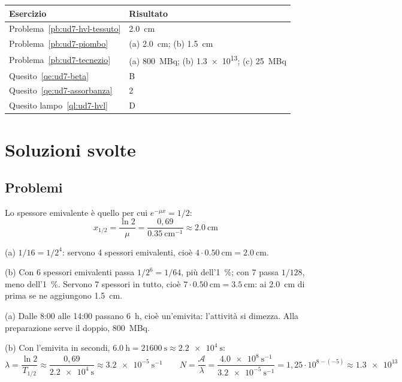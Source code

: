 \begin{center}
\begin{tabular}{@{}ll@{}}
\toprule
Esercizio & Risultato \\
\midrule
Problema~\ref{pb:ud7-hvl-tessuto} & \SI{2,0}{\centi\metre} \\
Problema~\ref{pb:ud7-piombo} & (a) \SI{2,0}{\centi\metre}; (b) \SI{1,5}{\centi\metre} \\
Problema~\ref{pb:ud7-tecnezio} & (a) \SI{800}{\mega\becquerel}; (b) \num{1,3e13}; (c) \SI{25}{\mega\becquerel} \\
Quesito~\ref{qe:ud7-beta} & B \\
Quesito~\ref{qe:ud7-assorbanza} & 2 \\
Quesito lampo~\ref{ql:ud7-hvl} & D \\
\bottomrule
\end{tabular}
\end{center}

\section*{Soluzioni svolte}

\subsection*{Problemi}

Lo spessore emivalente è quello per cui $e^{-\mu x} = 1/2$:
\[
  x_{1/2} = \frac{\ln 2}{\mu} = \frac{0{,}69}{\SI[per-mode=power]{0,35}{\centi\metre\tothe{-1}}} \approx \SI{2,0}{\centi\metre}
\]

(a) $1/16 = 1/2^4$: servono 4 spessori emivalenti, cioè $4 \cdot \SI{0,50}{\centi\metre} = \SI{2,0}{\centi\metre}$.

(b) Con 6 spessori emivalenti passa $1/2^6 = 1/64$, più dell'\SI{1}{\percent}; con 7 passa $1/128$, meno dell'\SI{1}{\percent}. Servono 7 spessori in tutto, cioè $7 \cdot \SI{0,50}{\centi\metre} = \SI{3,5}{\centi\metre}$: ai \SI{2,0}{\centi\metre} di prima se ne aggiungono \SI{1,5}{\centi\metre}.


(a) Dalle 8:00 alle 14:00 passano \SI{6}{\hour}, cioè un'emivita: l'attività si dimezza. Alla preparazione serve il doppio, \SI{800}{\mega\becquerel}.

(b) Con l'emivita in secondi, $\SI{6,0}{\hour} = \SI{21600}{\second} \approx \SI{2,2e4}{\second}$:
\[
  \lambda = \frac{\ln 2}{T_{1/2}} \approx \frac{0{,}69}{\SI{2,2e4}{\second}} \approx \SI[per-mode=power]{3,2e-5}{\second\tothe{-1}}
  \qquad
  N = \frac{\mathcal{A}}{\lambda} = \frac{\SI[per-mode=power]{4,0e8}{\second\tothe{-1}}}{\SI[per-mode=power]{3,2e-5}{\second\tothe{-1}}} = 1{,}25 \cdot 10^{8-(-5)} \approx \num{1,3e13}
\]

